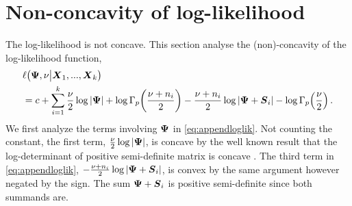 \documentclass{article}\usepackage[]{graphicx}\usepackage[]{color}
\begin{document}
\section{Non-concavity of log-likelihood}
\label{sec:concaveloglik}
The log-likelihood is not concave.
This section analyse the (non)-concavity of the log-likelihood function,
\small
\begin{align}
  &\ell\!\left(\vPsi, \nu \big| \vX_1, ..., \vX_k \right) \notag \\
  &= c + \sum_{i=1}^k
            \frac{\nu}{2}  \log |\vPsi|
            + \log \Gamma_p\!\left(\frac{\nu + n_i}{2}\right)  %
           - \frac{\nu + n_i}{2}\log|\vPsi +\vS_i|
            - \log \Gamma_p\!\left(\frac{\nu}{2}\right).
            \label{eq:appendloglik}
\end{align}
\normalsize
We first analyze the terms involving ${\boldsymbol{\Psi}}$ in \eqref{eq:appendloglik}. Not counting the constant, the first term, $\frac{\nu}{2}  \log | {\boldsymbol{\Psi}} |$, is concave by the well known result that the log-determinant of positive semi-definite matrix is concave \citep[See e.g.][pp. 73-74]{Boyd2004}.
The third term in \eqref{eq:appendloglik}, $- \frac{\nu + n_i}{2}\log|{\boldsymbol{\Psi}} + {\boldsymbol{S}}_i|$, is convex by the same argument however negated by the sign.
The sum ${\boldsymbol{\Psi}} +{\boldsymbol{S}}_i$ is positive semi-definite since both summands are.
\end{document}
